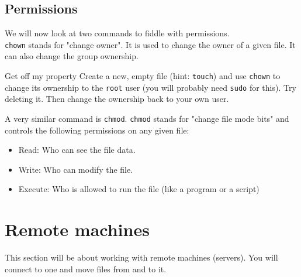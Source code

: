 \documentclass{TheAlternativeCourse}
\begin{document}
\subsection{Permissions}

We will now look at two commands to fiddle with permissions.\\

\texttt{chown} stands for "change owner". It is used to change the owner of a given file. It can also change the group ownership.

\begin{exercisebox}{Get off my property}
	Create a new, empty file (hint: \texttt{touch}) and use \texttt{chown} to change its ownership to the \texttt{root} user (you will probably need \texttt{sudo} for this). Try deleting it. Then change the ownership back to your own user.
\end{exercisebox}

A very similar command is \texttt{chmod}. \texttt{chmod} stands for "change file mode bits" and controls the following permissions on any given file:
\begin{itemize}
	\item Read: Who can see the file data.
	\item Write: Who can modify the file.
	\item Execute: Who is allowed to run the file (like a program or a script)
\end{itemize}


\section{Remote machines}

This section will be about working with remote machines (servers). You will
connect to one and move files from and to it. \\

%
\end{document}
